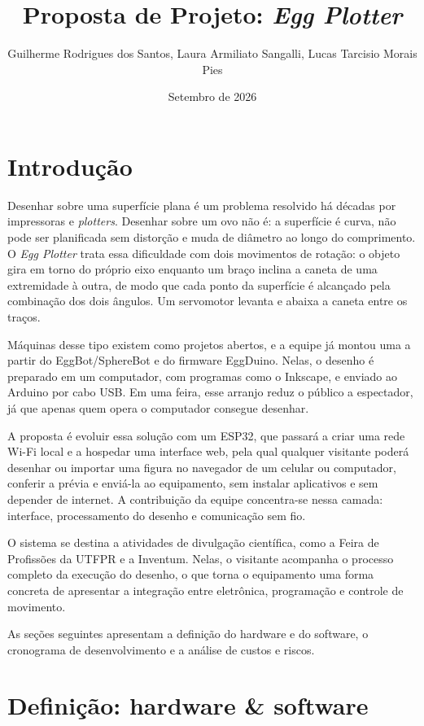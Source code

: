 \documentclass[10pt,a4paper]{article}
\title{Proposta de Projeto: \textit{Egg Plotter}}
\author{Guilherme Rodrigues dos Santos, Laura Armiliato Sangalli, Lucas Tarcisio Morais Pies}
\date{Setembro de 2026}
\begin{document}
%
%
%
%


\maketitle

\section{Introdução}

Desenhar sobre uma superfície plana é um problema resolvido há décadas por
impressoras e \textit{plotters}. Desenhar sobre um ovo não é: a superfície
é curva, não pode ser planificada sem distorção e muda de diâmetro ao longo
do comprimento. O \textit{Egg Plotter} trata essa dificuldade com dois
movimentos de rotação: o objeto gira em torno do próprio eixo enquanto um
braço inclina a caneta de uma extremidade à outra, de modo que cada ponto
da superfície é alcançado pela combinação dos dois ângulos. Um servomotor
levanta e abaixa a caneta entre os traços.

Máquinas desse tipo existem como projetos abertos, e a equipe já montou
uma a partir do EggBot/SphereBot e do firmware EggDuino. Nelas, o desenho
é preparado em um computador, com programas como o Inkscape, e enviado ao
Arduino por cabo USB. Em uma feira, esse arranjo reduz o público a
espectador, já que apenas quem opera o computador consegue desenhar.

A proposta é evoluir essa solução com um ESP32, que passará a criar uma
rede Wi-Fi local e a hospedar uma interface web, pela qual qualquer
visitante poderá desenhar ou importar uma figura no navegador de um
celular ou computador, conferir a prévia e enviá-la ao equipamento, sem
instalar aplicativos e sem depender de internet. A contribuição da equipe
concentra-se nessa camada: interface, processamento do desenho e
comunicação sem fio.

O sistema se destina a atividades de divulgação científica, como a Feira
de Profissões da UTFPR e a Inventum. Nelas, o visitante acompanha o
processo completo da execução do desenho, o que
torna o equipamento uma forma concreta de apresentar a integração entre
eletrônica, programação e controle de movimento.

As seções seguintes apresentam a definição do hardware e do software, o
cronograma de desenvolvimento e a análise de custos e riscos.


\section{Definição: hardware \& software}
\end{document}
